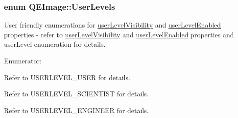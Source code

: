 \hypertarget{classQEImage_afc6169e5bb55dd0d3757ba09e3afe335}{
\subsubsection[{UserLevels}]{\setlength{\rightskip}{0pt plus 5cm}enum {\bf QEImage::UserLevels}}}
\label{classQEImage_afc6169e5bb55dd0d3757ba09e3afe335}
User friendly enumerations for \hyperlink{classQEImage_a777c21b8780f53a99f930ca19dc5cbe5}{userLevelVisibility} and \hyperlink{classQEImage_a25b8ba9d335dce7a4fd1eb9de3c62446}{userLevelEnabled} properties -\/ refer to \hyperlink{classQEImage_a777c21b8780f53a99f930ca19dc5cbe5}{userLevelVisibility} and \hyperlink{classQEImage_a25b8ba9d335dce7a4fd1eb9de3c62446}{userLevelEnabled} properties and userLevel enumeration for details. \begin{Desc}
\item[Enumerator: ]\par
\begin{description}
\item[{\em 
\hypertarget{classQEImage_afc6169e5bb55dd0d3757ba09e3afe335aa36c8539f2cdd9d20659c3fcdfb629dc}{
User}
\label{classQEImage_afc6169e5bb55dd0d3757ba09e3afe335aa36c8539f2cdd9d20659c3fcdfb629dc}
}]Refer to USERLEVEL\_\-USER for details. \item[{\em 
\hypertarget{classQEImage_afc6169e5bb55dd0d3757ba09e3afe335aaa35e1668d3af0eae0e774a33faf7e14}{
Scientist}
\label{classQEImage_afc6169e5bb55dd0d3757ba09e3afe335aaa35e1668d3af0eae0e774a33faf7e14}
}]Refer to USERLEVEL\_\-SCIENTIST for details. \item[{\em 
\hypertarget{classQEImage_afc6169e5bb55dd0d3757ba09e3afe335a87ef06e436d3f381379aa8b6ab45ce85}{
Engineer}
\label{classQEImage_afc6169e5bb55dd0d3757ba09e3afe335a87ef06e436d3f381379aa8b6ab45ce85}
}]Refer to USERLEVEL\_\-ENGINEER for details. \end{description}
\end{Desc}



